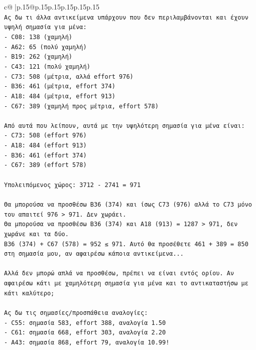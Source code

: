 \documentclass{article}
\begin{document}
{\begin{supertabular}{c@{$\;$}|p{.15\linewidth}@{}p{.15\linewidth}p{.15\linewidth}p{.15\linewidth}p{.15\linewidth}p{.15\linewidth}}
{{{\\ 
\texttt{Ας δω τι άλλα αντικείμενα υπάρχουν που δεν περιλαμβάνονται και έχουν υψηλή σημασία για μένα:} \\
\texttt{{-} C08: 138 (χαμηλή)} \\
\texttt{{-} A62: 65 (πολύ χαμηλή)} \\
\texttt{{-} B19: 262 (χαμηλή)} \\
\texttt{{-} C43: 121 (πολύ χαμηλή)} \\
\texttt{{-} C73: 508 (μέτρια, αλλά effort 976)} \\
\texttt{{-} B36: 461 (μέτρια, effort 374)} \\
\texttt{{-} A18: 484 (μέτρια, effort 913)} \\
\texttt{{-} C67: 389 (χαμηλή προς μέτρια, effort 578)} \\
\\ 
\texttt{Από αυτά που λείπουν, αυτά με την υψηλότερη σημασία για μένα είναι:} \\
\texttt{{-} C73: 508 (effort 976)} \\
\texttt{{-} A18: 484 (effort 913)} \\
\texttt{{-} B36: 461 (effort 374)} \\
\texttt{{-} C67: 389 (effort 578)} \\
\\ 
\texttt{Υπολειπόμενος χώρος: 3712 {-} 2741 = 971} \\
\\ 
\texttt{Θα μπορούσα να προσθέσω B36 (374) και ίσως C73 (976) αλλά το C73 μόνο του απαιτεί 976 > 971. Δεν χωράει.} \\
\texttt{Θα μπορούσα να προσθέσω B36 (374) και A18 (913) = 1287 > 971, δεν χωράνε και τα δύο.} \\
\texttt{B36 (374) + C67 (578) = 952 ≤ 971. Αυτό θα προσέθετε 461 + 389 = 850 στη σημασία μου, αν αφαιρέσω κάποια αντικείμενα...} \\
\\ 
\texttt{Αλλά δεν μπορώ απλά να προσθέσω, πρέπει να είναι εντός ορίου. Αν αφαιρέσω κάτι με χαμηλότερη σημασία για μένα και το αντικαταστήσω με κάτι καλύτερο;} \\
\\ 
\texttt{Ας δω τις σημασίες/προσπάθεια αναλογίες:} \\
\texttt{{-} C55: σημασία 583, effort 388, αναλογία 1.50} \\
\texttt{{-} C61: σημασία 668, effort 303, αναλογία 2.20} \\
\texttt{{-} A43: σημασία 868, effort 79, αναλογία 10.99!} \\
}}}
\end{supertabular}}
\end{document}
